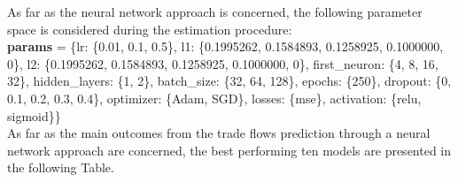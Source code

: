 \documentclass{Trade_template}
\numberwithin{equation}{section}
\begin{document}
As far as the neural network approach is concerned, the following parameter space is considered during the estimation procedure:\\ 

\textbf{params} = \{lr: \{0.01, 0.1, 0.5\},
        l1: \{0.1995262, 0.1584893, 0.1258925, 0.1000000, 0\},
        l2: \{0.1995262, 0.1584893, 0.1258925, 0.1000000, 0\},
        first\_neuron: \{4, 8, 16, 32\},
        hidden\_layers: \{1, 2\},
        batch\_size: \{32, 64, 128\},
        epochs: \{250\},
        dropout: \{0, 0.1, 0.2, 0.3, 0.4\},
        optimizer: \{Adam, SGD\},
        losses: \{mse\},
        activation: \{relu, sigmoid\}\} \\

As far as the main outcomes from the trade flows prediction through a neural network approach are concerned, the best performing ten models are presented in the following  Table. 

\newpage
\end{document}
